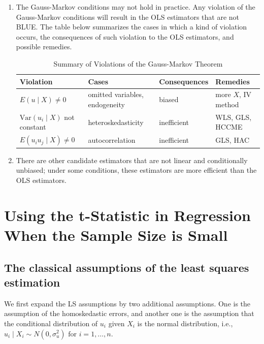 \documentclass[a4paper,11pt]{article}
\newcommand{\var}{\mathrm{Var}}
\begin{document}
\begin{enumerate}
\item The Gauss-Markov conditions may not hold in practice. Any violation
of the Gauss-Markov conditions will result in the OLS estimators
that are not BLUE. The table below summarizes the cases in which a
kind of violation occurs, the consequences of such violation to the
OLS estimators, and possible remedies.

\begin{table}[htbp]
\caption{Summary of Violations of the Gauss-Markov Theorem}
\centering
\small
\begin{tabular}{p{4cm}|p{5.5cm}|p{2.5cm}|p{3.4cm}}
\toprule
Violation & Cases & Consequences & Remedies\\
\midrule
\(E(u \mid X) \neq 0\) & omitted variables, endogeneity & biased & more \(X\), IV method\\
\(\var(u_i\mid X)\) not constant & heteroskedasticity & inefficient & WLS, GLS, HCCME\\
\(E(u_{i}u_{j}\mid X) \neq 0\) & autocorrelation & inefficient & GLS, HAC\\
\bottomrule
\end{tabular}
\end{table}

\item There are other candidate estimators that are not linear and
conditionally unbiased; under some conditions, these estimators are
more efficient than the OLS estimators.
\end{enumerate}


\section{Using the t-Statistic in Regression When the Sample Size is Small}
\label{sec:org46fe3f6}

\subsection{The classical assumptions of the least squares estimation}
\label{sec:orgd68569b}

We first expand the LS assumptions by two additional assumptions. One
is the assumption of the homoskedastic errors, and another one is the
assumption that the conditional distribution of \(u_i\) given \(X_i\) is
the normal distribution, i.e., \(u_i \mid X_i \sim N(0, \sigma^2_u) \text{ for }
i = 1, \ldots, n\).
\end{document}
